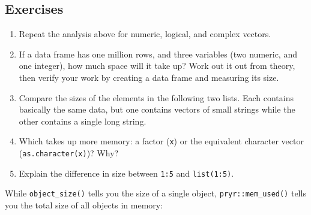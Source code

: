 \subsection{Exercises}

\begin{enumerate}
\def\labelenumi{\arabic{enumi}.}
\item
  Repeat the analysis above for numeric, logical, and complex vectors.
\item
  If a data frame has one million rows, and three variables (two
  numeric, and one integer), how much space will it take up? Work out it
  out from theory, then verify your work by creating a data frame and
  measuring its size.
\item
  Compare the sizes of the elements in the following two lists. Each
  contains basically the same data, but one contains vectors of small
  strings while the other contains a single long string.

\begin{Shaded}
\begin{Highlighting}[]
\StringTok{ }\NormalTok{(}\NormalTok{:}\NormalTok{(}\NormalTok{, }\NormalTok{(}
\StringTok{ } \NormalTok{)}
\end{Highlighting}
\end{Shaded}
\item
  Which takes up more memory: a factor (\texttt{x}) or the equivalent
  character vector (\texttt{as.character(x)})? Why?
\item
  Explain the difference in size between \texttt{1:5} and
  \texttt{list(1:5)}.
\end{enumerate}


While \texttt{object\_size()} tells you the size of a single object,
\texttt{pryr::mem\_used()} tells you the total size of all objects in
memory: 

\begin{Shaded}
\begin{Highlighting}[]
\NormalTok{()}
\end{Highlighting}
\end{Shaded}

